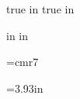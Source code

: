 %
%

\sloppy

\newif\iflong %
\longfalse
\def\piflong#1{\iflong#1
\else\fi}%
\long\def\lpiflong#1{\iflong#1
\else\fi}%

\def\xpair{{x_1,x_2}}

 true in
 true in
\nopagenumbers

\def\compressedDisplay#1{\vskip -8pt\relax$$#1$$}

 in
 in
\hsize=8in
\vsize=10.5in
\parindent=0pt

\font\smallfont=cmr7


\def\strutA#1#2{\vrule height#1 depth#2 width0pt}

=3.93in
\newbox\bigbox

